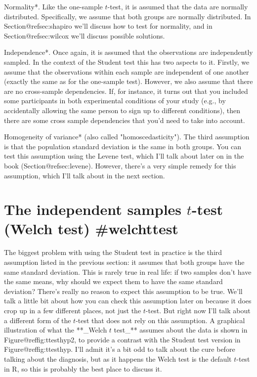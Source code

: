 \item *Normality*. Like the one-sample $t$-test, it is assumed that the data are normally distributed. Specifically, we assume that both groups are normally distributed. In Section@refsec:shapiro we'll discuss how to test for normality, and in Section@refsec:wilcox we'll discuss possible solutions.
\item *Independence*. Once again, it is assumed that the observations are independently sampled. In the context of the Student test this has two aspects to it. Firstly, we assume that the observations within each sample are independent of one another (exactly the same as for the one-sample test). However, we also assume that there are no cross-sample dependencies. If, for instance, it turns out that you included some participants in both experimental conditions of your study (e.g., by accidentally allowing the same person to sign up to different conditions), then there are some cross sample dependencies that you'd need to take into account.
\item *Homogeneity of variance* (also called "homoscedasticity"). The third assumption is that the population standard deviation is the same in both groups. You can test this assumption using the Levene test, which I'll talk about later on in the book (Section@refsec:levene). However, there's a very simple remedy for this assumption, which I'll talk about in the next section.






\section{The independent samples $t$-test (Welch test) {#welchttest}}

The biggest problem with using the Student test in practice is the third assumption listed in the previous section: it assumes that both groups have the same standard deviation. This is rarely true in real life: if two samples don't have the same means, why should we expect them to have the same standard deviation? There's really no reason to expect this assumption to be true. We'll talk a little bit about how you can check this assumption later on because it does crop up in a few different places, not just the $t$-test. But right now I'll talk about a different form of the $t$-test \cite{Welch1947} that does not rely on this assumption. A graphical illustration of what the **_Welch $t$ test_** assumes about the data is shown in Figure@reffig:ttesthyp2, to provide a contrast with the Student test version in Figure@reffig:ttesthyp. I'll admit it's a bit odd to talk about the cure before talking about the diagnosis, but as it happens the Welch test is the default $t$-test in R, so this is probably the best place to discuss it. 

